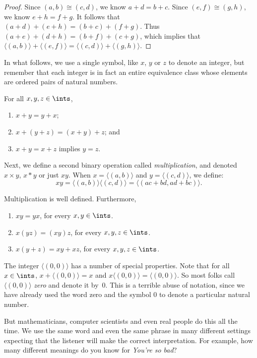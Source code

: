 \begin{proof}
Since $(a,b)\cong(c,d)$, we know
$a+d=b+c$.  Since $(e,f)\cong(g,h)$, 
we know $e+h=f+g$. It follows that $(a+d)+(e+h) = (b+c)+ (f+g)$.
Thus $(a+e)+(d+h)= (b+f)+(c+g)$, which implies that
$\langle(a,b)\rangle+\langle(e,f)\rangle=
\langle(c,d)\rangle+\langle(g,h)\rangle$.
\end{proof}

In what follows, we use a single symbol, like $x$, $y$ or
$z$ to denote an integer, but remember that each integer
is in fact an entire equivalence class whose elements are 
ordered pairs of natural numbers.

\begin{theorem}
For all $x,y,z\in\ints$,
\begin{enumerate}
\item $x+y=y+x$;
\item $x+(y+z)= (x+y)+z$; and
\item $x+y= x+z$ implies $y=z$.
\end{enumerate}
\end{theorem}

Next, we define a second binary operation called
\textit{multiplication}, and denoted $x\times y$, $x*y$ or
just $xy$.  When $x=\langle(a,b)\rangle$ and $y=\langle(c,d)\rangle$, 
we define:
\[
xy =\langle(a,b)\rangle\langle(c,d)\rangle= \langle(ac+bd, ad+bc)\rangle.
\]

\begin{theorem}  Multiplication is well defined.  Furthermore,
\begin{enumerate}
\item $xy=yx$,  for every $x,y\in \ints$.
\item $x(yz)=(xy)z$, for every $x,y,z\in \ints$.
\item $x(y+z)=xy+xz$, for every $x,y,z\in \ints$.
\end{enumerate}
\end{theorem}

The integer $\langle(0,0)\rangle$ has a number of special properties. 
Note that for all $x\in\ints$, $x+\langle(0,0)\rangle= x$ 
and $x\langle(0,0)\rangle=\langle(0,0)\rangle$.
So most folks call $\langle(0,0)\rangle$ \textit{zero}
and denote it by~$0$.  This is a terrible abuse of notation, 
since we have already used the word zero and the symbol $0$ to 
denote a particular natural number.

But mathematicians, computer scientists and even
real people do this all the time.  We use the same
word and even the same phrase in many different settings 
expecting that the listener
will make the correct interpretation.  For example, how many
different meanings do you know for \textit{You're so bad}?


